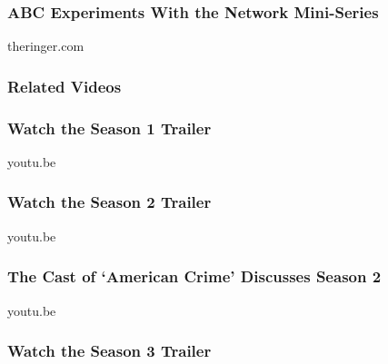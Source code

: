 \href{https://theringer.com/abc-miniseries-when-we-rise-american-crime-b1318c140d1e\#.meogkilxn}{}

\hypertarget{abc-experiments-with-the-network-mini-series}{%
\subsubsection{ABC Experiments With the Network
Mini-Series}\label{abc-experiments-with-the-network-mini-series}}

theringer.com

\hypertarget{related-videos}{%
\subsubsection{Related Videos}\label{related-videos}}

\href{https://youtu.be/Uu2P7ABRLRw}{}

\hypertarget{watch-the-season-1-trailer}{%
\subsubsection{Watch the Season 1
Trailer}\label{watch-the-season-1-trailer}}

youtu.be

\href{https://youtu.be/5gkJiPRkbj8}{}

\hypertarget{watch-the-season-2-trailer}{%
\subsubsection{Watch the Season 2
Trailer}\label{watch-the-season-2-trailer}}

youtu.be

\href{https://youtu.be/bfGwQm-SsPs}{}

\hypertarget{the-cast-of-american-crime-discusses-season-2}{%
\subsubsection{The Cast of `American Crime' Discusses Season
2}\label{the-cast-of-american-crime-discusses-season-2}}

youtu.be

\href{https://www.youtube.com/watch?v=kY21RZvuF2A}{}

\hypertarget{watch-the-season-3-trailer}{%
\subsubsection{Watch the Season 3
Trailer}\label{watch-the-season-3-trailer}}

